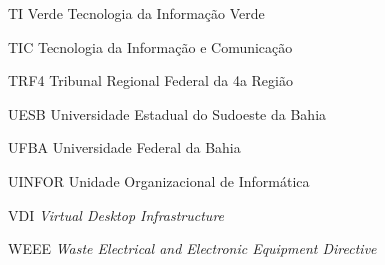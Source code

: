 \begin{siglas}
    \item[TI Verde]	Tecnologia da Informação Verde
    \item[TIC]  	Tecnologia da Informação e Comunicação
    \item[TRF4]	    Tribunal Regional Federal da 4a Região
    \item[UESB]	    Universidade Estadual do Sudoeste da Bahia
    \item[UFBA]	    Universidade Federal da Bahia
    \item[UINFOR]	Unidade Organizacional de Informática
    \item[VDI]	    \textit{Virtual Desktop Infrastructure}
    \item[WEEE]	    \textit{Waste Electrical and Electronic Equipment Directive}
    
    

\end{siglas}
